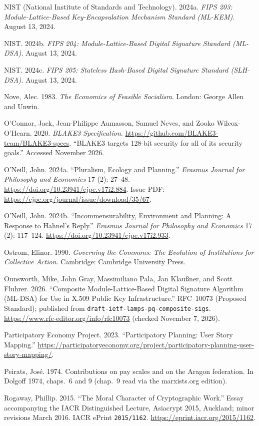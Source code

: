 \documentclass[10pt,twoside,openany]{book}
\theoremstyle{dpepstyle}
\begin{document}
\begin{list}{}{\setlength{\leftmargin}{1.8em}\setlength{\itemindent}{-1.8em}\setlength{\itemsep}{3pt}\setlength{\parsep}{0pt}}
\item NIST (National Institute of Standards and Technology). 2024a. \emph{FIPS 203: Module-Lattice-Based Key-Encapsulation Mechanism Standard (ML-KEM)}. August 13, 2024.
\item NIST. 2024b. \emph{FIPS 204: Module-Lattice-Based Digital Signature Standard (ML-DSA)}. August 13, 2024.
\item NIST. 2024c. \emph{FIPS 205: Stateless Hash-Based Digital Signature Standard (SLH-DSA)}. August 13, 2024.
\item Nove, Alec. 1983. \emph{The Economics of Feasible Socialism}. London: George Allen and Unwin.
\item O'Connor, Jack, Jean-Philippe Aumasson, Samuel Neves, and Zooko Wilcox-O'Hearn. 2020. \emph{BLAKE3 Specification}. \url{https://github.com/BLAKE3-team/BLAKE3-specs}. ``BLAKE3 targets 128-bit security for all of its security goals.'' Accessed November 2026.
\item O'Neill, John. 2024a. ``Pluralism, Ecology and Planning.'' \emph{Erasmus Journal for Philosophy and Economics} 17 (2): 27--48. \url{https://doi.org/10.23941/ejpe.v17i2.884}. Issue PDF: \url{https://ejpe.org/journal/issue/download/35/67}.
\item O'Neill, John. 2024b. ``Incommensurability, Environment and Planning: A Response to Hahnel's Reply.'' \emph{Erasmus Journal for Philosophy and Economics} 17 (2): 117--124. \url{https://doi.org/10.23941/ejpe.v17i2.933}.
\item Ostrom, Elinor. 1990. \emph{Governing the Commons: The Evolution of Institutions for Collective Action}. Cambridge: Cambridge University Press.
\item Ounsworth, Mike, John Gray, Massimiliano Pala, Jan Klau\ss{}ner, and Scott Fluhrer. 2026. ``Composite Module-Lattice-Based Digital Signature Algorithm (ML-DSA) for Use in X.509 Public Key Infrastructure.'' RFC~10073 (Proposed Standard); published from \texttt{draft-ietf-lamps-pq-composite-sigs}. \url{https://www.rfc-editor.org/info/rfc10073} (checked November 7, 2026).
\item Participatory Economy Project. 2023. ``Participatory Planning: User Story Mapping.'' \url{https://participatoryeconomy.org/project/participatory-planning-user-story-mapping/}.
\item Peirats, Jos\'e. 1974. Contributions on pay scales and on the Aragon federation. In Dolgoff 1974, chaps.~6 and 9 (chap.~9 read via the marxists.org edition).
\item Rogaway, Phillip. 2015. ``The Moral Character of Cryptographic Work.'' Essay accompanying the IACR Distinguished Lecture, Asiacrypt 2015, Auckland; minor revisions March 2016. IACR ePrint \texttt{2015/1162}. \url{https://eprint.iacr.org/2015/1162}.

\end{list}
\end{document}
